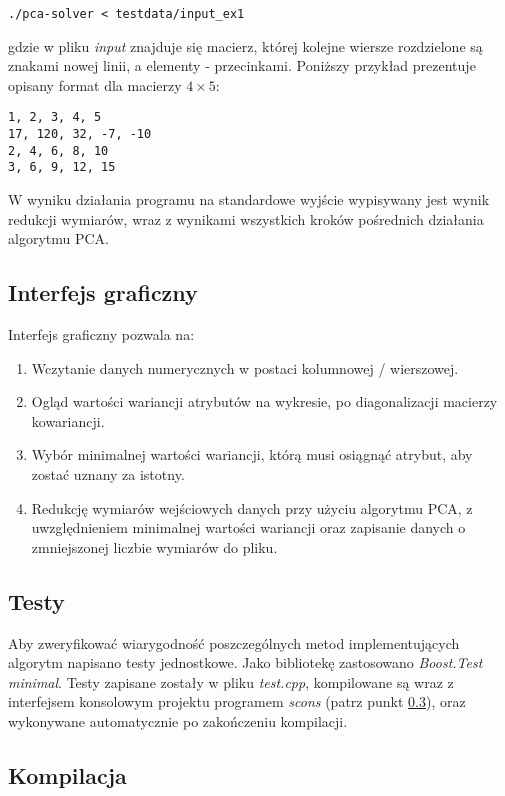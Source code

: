\documentclass{article}
\begin{document}
\begin{verbatim}
./pca-solver < testdata/input_ex1
\end{verbatim}

\noindent gdzie w pliku \emph{input} znajduje się macierz, której kolejne wiersze rozdzielone są znakami nowej linii, a elementy - przecinkami. Poniższy przykład prezentuje opisany format dla macierzy $4 \times 5$:

\begin{verbatim}
1, 2, 3, 4, 5
17, 120, 32, -7, -10
2, 4, 6, 8, 10
3, 6, 9, 12, 15
\end{verbatim}

\noindent W wyniku działania programu na standardowe wyjście wypisywany jest wynik redukcji wymiarów, wraz z wynikami wszystkich kroków pośrednich działania algorytmu PCA.

\subsection{Interfejs graficzny}

Interfejs graficzny pozwala na:
\begin{enumerate}
\item{Wczytanie danych numerycznych w postaci kolumnowej / wierszowej.}
\item{Ogląd wartości wariancji atrybutów na wykresie, po diagonalizacji macierzy kowariancji.}
\item{Wybór minimalnej wartości wariancji, którą musi osiągnąć atrybut, aby zostać uznany za istotny.}
\item{Redukcję wymiarów wejściowych danych przy użyciu algorytmu PCA, z uwzględnieniem minimalnej wartości wariancji oraz zapisanie danych o zmniejszonej liczbie wymiarów do pliku.}
\end{enumerate}

\subsection{Testy}

Aby zweryfikować wiarygodność poszczególnych metod implementujących algorytm napisano testy jednostkowe. Jako bibliotekę zastosowano \emph{Boost.Test minimal}. Testy zapisane zostały w pliku \emph{test.cpp}, kompilowane są wraz z interfejsem konsolowym projektu programem \emph{scons} (patrz punkt \ref{lab_kompilacja}), oraz wykonywane automatycznie po zakończeniu kompilacji.

\subsection{Kompilacja} \label{lab_kompilacja}
\end{document}
